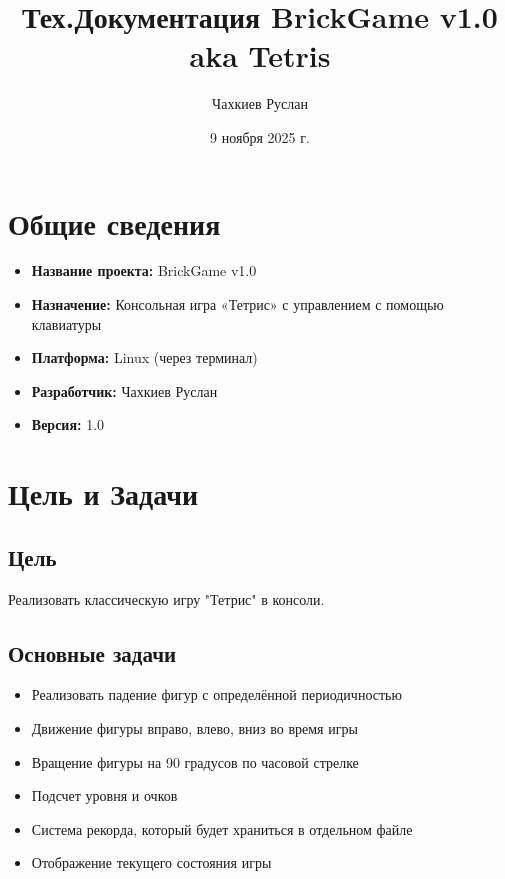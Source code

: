\documentclass[a4paper, 12pt]{report}
\author{Чахкиев Руслан}
\title{Тех.Документация BrickGame v1.0 aka Tetris}
\date{9 ноября 2025 г.}
\begin{document}
\maketitle
\tableofcontents{}

\clearpage
\chapter{Общие сведения}

\begin{itemize}
    \item \textbf{Название проекта:} BrickGame v1.0
    \item \textbf{Назначение:} Консольная игра «Тетрис» с управлением с помощью клавиатуры
    \item \textbf{Платформа:} Linux (через терминал)
    \item \textbf{Разработчик:} Чахкиев Руслан
    \item \textbf{Версия:} 1.0
\end{itemize}

\clearpage
\chapter{Цель и Задачи}

\section{Цель}
Реализовать классическую игру "Тетрис" в консоли.

\section{Основные задачи}
\begin{itemize}[label=\textcolor{black}{\textbf{\textendash}}]
    \item Реализовать падение фигур с определённой периодичностью
    \item Движение фигуры вправо, влево, вниз во время игры
    \item Вращение фигуры на 90 градусов по часовой стрелке
    \item Подсчет уровня и очков
    \item Система рекорда, который будет храниться в отдельном файле
    \item Отображение текущего состояния игры
\end{itemize}
\end{document}
